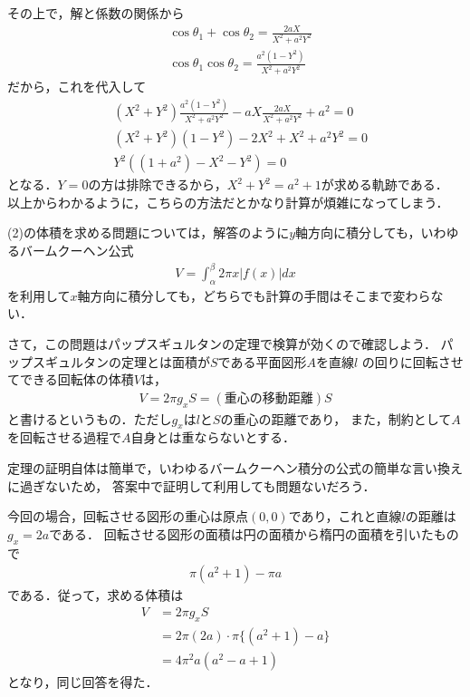 \documentclass[a4paper,10pt]{ltjsarticle}
\begin{document}
\begin{multicols}{2}
その上で，解と係数の関係から
\begin{align}
  &\cos\theta_1 + \cos\theta_2 = \frac{2aX}{X^2+a^2Y^2} \\
  &\cos\theta_1\cos\theta_2    = \frac{a^2\left(1-Y^2\right)}{X^2+a^2Y^2} 
\end{align}
だから，これを代入して
\begin{align*}
  &\left(X^2+Y^2\right)\frac{a^2\left(1-Y^2\right)}{X^2+a^2Y^2} -aX\frac{2aX}{X^2+a^2Y^2} + a^2 = 0 \\
  &\left(X^2+Y^2\right)\left(1-Y^2\right) -2X^2 + X^2+a^2Y^2 = 0 \\
  &Y^2\left((1+a^2) - X^2-Y^2\right) = 0 
\end{align*}
となる．$Y=0$の方は排除できるから，$X^2+Y^2=a^2+1$が求める軌跡である．
以上からわかるように，こちらの方法だとかなり計算が煩雑になってしまう．

\vspace{10pt}
(2)の体積を求める問題については，解答のように$y$軸方向に積分しても，いわゆるバームクーヘン公式
\begin{align*}
  V = \int_{\alpha}^{\beta} 2\pi x |f(x)| dx
\end{align*}
を利用して$x$軸方向に積分しても，どちらでも計算の手間はそこまで変わらない．

さて，この問題はパップスギュルタンの定理で検算が効くので確認しよう．
パップスギュルタンの定理とは面積が$S$である平面図形$A$を直線$l$ の回りに回転させてできる回転体の体積$V$は，
\begin{align*}
  V=2\pi g_x S = (\text{重心の移動距離}) S
\end{align*}
と書けるというもの．ただし$g_x$は$l$と$S$の重心の距離であり，
また，制約として$A$を回転させる過程で$A$自身とは重ならないとする．

定理の証明自体は簡単で，いわゆるバームクーヘン積分の公式の簡単な言い換えに過ぎないため，
答案中で証明して利用しても問題ないだろう．

今回の場合，回転させる図形の重心は原点$(0,0)$であり，これと直線$l$の距離は$g_x =2a$である．
回転させる図形の面積は円の面積から楕円の面積を引いたもので
\begin{align*}
  \pi(a^2+1) - \pi a
\end{align*}
である．従って，求める体積は
\begin{align*}
    V 
    &= 2\pi g_x S \\
    &= 2\pi (2a) \cdot \pi \{(a^2+1)-a\} \\
    &= 4\pi^2 a(a^2-a+1) 
\end{align*}
となり，同じ回答を得た．

\newpage
\end{multicols}
\end{document}
